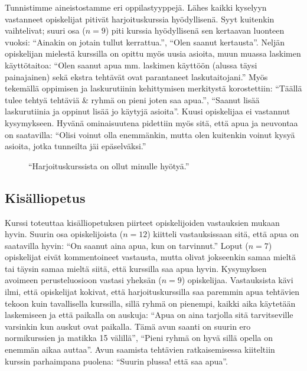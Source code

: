 Tunnistimme aineistostamme eri oppilastyyppejä.
Lähes kaikki kyselyyn vastanneet opiskelijat pitivät harjoituskurssia hyödyllisenä.
Syyt kuitenkin vaihtelivat; suuri osa ($n=9$) piti kurssia hyödyllisenä sen kertaavan luonteen vuoksi: ``Ainakin on jotain tullut kerrattua.'', ``Olen saanut kertausta''.
Neljän opiskelijan mielestä kurssilla on opittu myös uusia asioita, muun muassa laskimen käyttötaitoa: ``Olen saanut apua mm. laskimen käyttöön (alussa täysi painajainen) sekä ekstra tehtävät ovat parantaneet laskutaitojani.''
Myös tekemällä oppimisen ja laskurutiinin kehittymisen merkitystä korostettiin: ``Täällä tulee tehtyä tehtäviä \& ryhmä on pieni joten saa apua.'', ``Saanut lisää laskurutiinia ja oppinut lisää jo käytyjä asioita''. 
Kuusi opiskelijaa ei vastannut kysymykseen.
Hyvänä ominaisuutena pidettiin myös sitä, että apua ja neuvontaa on saatavilla: ``Olisi voinut olla enemmänkin, mutta olen kuitenkin voinut kysyä asioita, jotka tunneilta jäi epäselväksi.''

\begin{figure}[h!]
\centering
{}
\caption{``Harjoituskurssista on ollut minulle hyötyä.''}
\end{figure}

\subsection{Kisälliopetus}
Kurssi toteuttaa kisälliopetuksen piirteet opiskelijoiden vastauksien mukaan hyvin.
Suurin osa opiskelijoista ($n=12$) kiitteli vastauksissaan sitä, että apua on saatavilla hyvin: ``On saanut aina apua, kun on tarvinnut.''
Loput ($n=7$) opiskelijat eivät kommentoineet vastausta, mutta olivat jokseenkin samaa mieltä tai täysin samaa mieltä siitä, että kurssilla saa apua hyvin.
Kysymyksen avoimeen perusteluosioon vastasi yheksän ($n=9$) opiskelijaa. Vastauksista kävi ilmi, että opiskelijat kokivat, että harjoituskurssilla saa paremmin apua tehtävien tekoon kuin tavallisella kurssilla, sillä ryhmä on pienempi, kaikki aika käytetään laskemiseen ja että paikalla on auskuja: ``Apua on aina tarjolla sitä tarvitseville varsinkin kun auskut ovat paikalla. Tämä avun saanti on suurin ero normikurssien ja matikka 15 välillä'', ``Pieni ryhmä on hyvä sillä opella on enemmän aikaa auttaa''.  Avun saamista tehtävien ratkaisemisessa kiiteltiin kurssin parhaimpana puolena: ``Suurin plussa! että saa apua''. 

